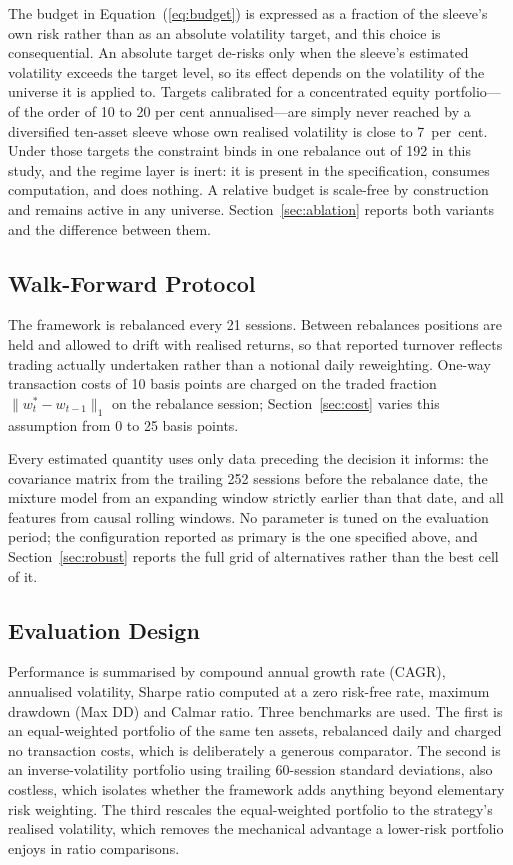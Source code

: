 The budget in Equation~(\ref{eq:budget}) is expressed as a fraction of the sleeve's own
risk rather than as an absolute volatility target, and this choice is consequential.
An absolute target de-risks only when the sleeve's estimated volatility exceeds the
target level, so its effect depends on the volatility of the universe it is applied to.
Targets calibrated for a concentrated equity portfolio---of the order of 10 to 20 per
cent annualised---are simply never reached by a diversified ten-asset sleeve whose own
realised volatility is close to 7~per~cent. Under those targets the constraint binds in
one rebalance out of 192 in this study, and the regime layer is inert: it is present in
the specification, consumes computation, and does nothing. A relative budget is
scale-free by construction and remains active in any universe.
Section~\ref{sec:ablation} reports both variants and the difference between them.

\subsection{Walk-Forward Protocol}

The framework is rebalanced every 21 sessions. Between rebalances positions are held
and allowed to drift with realised returns, so that reported turnover reflects trading
actually undertaken rather than a notional daily reweighting. One-way transaction costs
of 10 basis points are charged on the traded fraction $\|w^{\ast}_t - w_{t-1}\|_1$ on
the rebalance session; Section~\ref{sec:cost} varies this assumption from 0 to 25 basis
points.

Every estimated quantity uses only data preceding the decision it informs: the
covariance matrix from the trailing 252 sessions before the rebalance date, the mixture
model from an expanding window strictly earlier than that date, and all features from
causal rolling windows. No parameter is tuned on the evaluation period; the
configuration reported as primary is the one specified above, and
Section~\ref{sec:robust} reports the full grid of alternatives rather than the best
cell of it.

\subsection{Evaluation Design}

Performance is summarised by compound annual growth rate (CAGR), annualised
volatility, Sharpe ratio computed at a zero risk-free rate, maximum drawdown (Max DD)
and Calmar ratio. Three
benchmarks are used. The first is an equal-weighted portfolio of the same ten assets,
rebalanced daily and charged no transaction costs, which is deliberately a generous
comparator. The second is an inverse-volatility portfolio using trailing 60-session
standard deviations, also costless, which isolates whether the framework adds anything
beyond elementary risk weighting. The third rescales the equal-weighted portfolio to
the strategy's realised volatility, which removes the mechanical advantage a
lower-risk portfolio enjoys in ratio comparisons.

